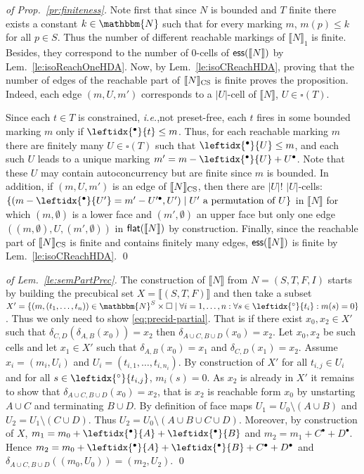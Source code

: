 \documentclass[runningheads,envcountsame]{llncs}
\newcommand*\ie{\textit{i.e.},}
\newcommand*\Nat{\mathbbm{N}}
\newcommand*\ess{\textup{\textsf{ess}}}
\newcommand*\prepla[1]{\leftidx{^\bullet}{#1}}
\newcommand*\pospla[1]{#1^\bullet}
\newcommand*\prepli[1]{\leftidx{^\circ}{#1}}
\newcommand*\sem[1]{\llbracket #1\rrbracket}
\newcommand*\flatten{\textup{\textsf{flat}}}
\begin{document}
\begin{proof}[of Prop.~\ref{pr:finiteness}]
	Note first that since $N$ is bounded and $T$ finite there exists a constant $k \in \Nat$ such that for every marking $m$,  $m(p) \leq k$ for all $p \in S$.
	Thus the number of different reachable markings of $\sem{N}_1$ is finite.
	Besides, they correspond to the number of $0$-cells of $\ess(\sem{N})$ by Lem.~\ref{le:isoReachOneHDA}.
	Now, by Lem.~\ref{le:isoCReachHDA}, proving that the number of edges  of the reachable part of $\sem{N}_{\textup{CS}}$ is finite proves the proposition.
	Indeed, each edge $(m,U,m')$ corresponds to a $|U|$-cell of $\sem{N}$, $U \in \square(T)$.
	
	Since each $t \in T$ is constrained, \ie not preset-free, each $t$ fires in some bounded marking $m$ only if $\prepla{t} \leq m$.
	Thus, for each reachable marking $m$ there are finitely many $U \in \square(T)$ such that $\prepla{U} \leq m$, and each such $U$ leads to a unique marking $m' = m - \prepla{U} + \pospla{U}$.
	Note that these $U$ may contain autoconcurrency but are finite since $m$ is bounded.
	In addition, if $(m,U,m')$ is an edge of $\sem{N}_{\textup{CS}}$, then there are $|U|!$ $|U|$-cells: $\{(m - \prepla{U'} = m' - \pospla{U'}, U')\mid U' \text{ a permutation of } U\}$ in $\sem{N}$ for which $(m,\emptyset)$ is a lower face and $(m',\emptyset)$ an upper face  but only one edge $((m,\emptyset),U,(m',\emptyset))$ in $\flatten(\sem{N})$ by construction.
	Finally, since the reachable part of $\sem{N}_{\textup{CS}}$ is finite and contains finitely many edges, $\ess(\sem{N})$ is finite by Lem.~\ref{le:isoCReachHDA}.
        \qed
\end{proof}

\begin{proof}[of Lem.~\ref{le:semPartPrec}]
  The construction of $\sem{N}$ from $N = (S,T,F,I)$ starts by building the precubical set $X=\sem{(S, T, F)}$ and then take a subset $X' = \{(m, (t_1,\dotsc, t_n))\in \Nat^S\times \square\mid \forall i=1,\dotsc, n: \forall s\in \prepli{t_i}: m(s)=0\}$.
  Thus we only need to show \eqref{eq:precid-partial}.
  That is if there exist $x_0,x_2 \in X'$ such that $\delta_{C, D}( \delta_{A, B}(x_0)) = x_2$ then $\delta_{A\cup C, B\cup D}(x_0) = x_2$.
  Let $x_0,x_2$ be such cells and let $x_1 \in X'$ such that $\delta_{A, B}(x_0) = x_1$ and $\delta_{C, D}(x_1) = x_2$.
  Assume $x_i=(m_i,U_i)$ and $U_i = (t_{i,1},\dots,t_{i,n_i})$.
  By construction of $X'$ for all $t_{i,j} \in U_i$ and for all $s \in \prepli{t_{i,j}}$, $m_i(s) = 0$.
  As $x_2$ is already in $X'$ it remains to show that $\delta_{A\cup C, B\cup D}(x_0) = x_2$, that is $x_2$ is reachable form $x_0$ by unstarting $A\cup C$ and terminating $B\cup D$.
  By definition of face maps $U_1 = U_0 \setminus (A \cup B)$ and $U_2 = U_1 \setminus  (C \cup D)$.
  Thus $U_2 = U_0 \setminus (A \cup B \cup C \cup D)$.
  Moreover, by construction of $X$, $m_1 = m_0 + \prepla{A} + \prepla{B}$ and $m_2 = m_1 + \pospla{C} + \pospla{D}$.
  Hence $m_2 = m_0 + \prepla{A} + \prepla{B} + \pospla{C} + \pospla{D}$ and $\delta_{A\cup C, B\cup D}((m_0,U_0)) = (m_2,U_2)$.
  \qed
\end{proof}
\end{document}
